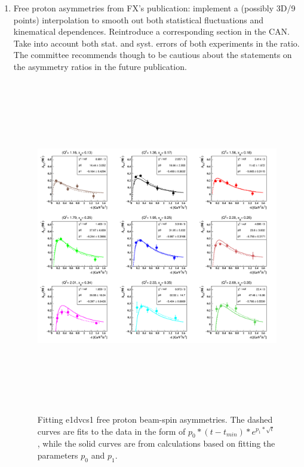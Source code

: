 \begin{enumerate}
\begin{enumerate}
\end{enumerate}

\item Free proton asymmetries from FX's publication: implement a (possibly 3D/9 
points) interpolation to smooth out both statistical fluctuations and 
kinematical dependences. Reintroduce a corresponding section in the CAN. Take 
into account both stat. and syst. errors of both experiments in the ratio. The 
committee recommends though to be cautious about the statements on the 
asymmetry ratios in the future publication.
  \begin{figure}[tbp]
    \includegraphics[height=14.6cm]{fig/ALU-proton-fits.png}
    \caption{ Fitting e1dvcs1 free proton beam-spin asymmetries. The dashed 
    curves are fits to the data in the form of 
 $p_{0}*(t-t_{min})*e^{p_{1}*\sqrt{t}}$, while the solid curves are from 
 calculations based on fitting the parameters $p_{0}$ and $p_{1}$.}
    \label{fig:free-proton-alu-fits}
    \end{figure}


\end{enumerate}
